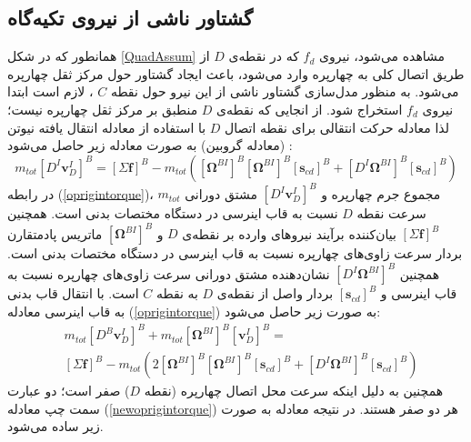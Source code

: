 \subsection{گشتاور ناشی از نیروی تكیه‌گاه}
همانطور که در شكل \ref{QuadAssum} مشاهده می‌شود، نیروی
$f_d$
که در نقطه‌ی 
$D$
از طریق اتصال کلی به چهارپره وارد می‌شود، باعث ایجاد گشتاور حول مرکز ثقل چهارپره می‌شود. به منظور مدل‌سازی گشتاور ناشی از این نیرو حول نقطه
$C$
، لازم است ابتدا نیروی
$f_d$
استخراج شود. از انجایی که نقطه‌ی
$D$
منطبق بر مرکز ثقل چهارپره نیست؛ لذا معادله حرکت انتقالی برای نقطه اتصال
$D$
با استفاده از معادله انتقال یافته نیوتن (معادله گروبین) به صورت معادله زیر حاصل می‌شود
\cite{zipfel2000modeling}
:
\begin{equation}\label{oprigintorque}
	m_{tot} \left[D^I\boldsymbol v_D^I\right]^B = 
	\left[\Sigma \boldsymbol f\right]^B-m_{tot}\left(
	\left[\boldsymbol \Omega^{BI}\right]^B
	\left[\boldsymbol\Omega^{BI}\right]^B
	\left[\boldsymbol s_{cd}\right]^B+
	\left[D^I\boldsymbol\Omega^{BI}\right]^B
	\left[\boldsymbol s_{cd}\right]^B
	\right)
\end{equation}
در رابطه
(\ref{oprigintorque})، 
$m_{tot}$
مجموع جرم چهارپره و 
$\left[D^I\boldsymbol v_D^I\right]^B$
مشتق دورانی سرعت نقطه
$D$
نسبت به قاب اینرسی در دستگاه مختصات بدنی است. همچنین
$\left[\Sigma \boldsymbol f\right]^B$
بیان‌کننده برآیند نیروهای وارده بر نقطه‌ی
$D$
و
$\left[\boldsymbol\Omega^{BI}\right]^B$
ماتریس پادمتقارن بردار سرعت زاوی‌های چهارپره نسبت به قاب اینرسی در دستگاه مختصات بدنی است. همچنین
$\left[D^I\boldsymbol \Omega^{BI}\right]^B$
نشان‌دهنده مشتق دورانی سرعت زاوی‌های چهارپره نسبت به قاب اینرسی و 
$\left[\boldsymbol s_{cd}\right]^B$
بردار واصل از نقطه‌ی
$D$
به نقطه
$C$
است. با انتقال قاب بدنی به قاب اینرسی معادله 
(\ref{oprigintorque})
به صورت زیر حاصل می‌شود:
\begin{equation}
\begin{split}\label{newoprigintorque}
	&m_{tot} \left[D^B\boldsymbol v_D^I\right]^B +
	m_{tot}\left[\boldsymbol\Omega^{BI}\right]^B
	\left[\boldsymbol v_D^{I}\right]^B = \\
	&\left[\Sigma \boldsymbol f\right]^B-m_{tot}\left(2
	\left[\boldsymbol\Omega^{BI}\right]^B
	\left[\boldsymbol\Omega^{BI}\right]^B
	\left[\boldsymbol s_{cd}\right]^B+
	\left[D^I\boldsymbol\Omega^{BI}\right]^B
	\left[\boldsymbol s_{cd}\right]^B
	\right)
\end{split}
\end{equation}
همچنین به دلیل اینكه سرعت محل اتصال چهارپره (نقطه
$D$)
صفر است؛ دو عبارت سمت چپ معادله
(\ref{newoprigintorque}) 
هر دو صفر هستند. در نتیجه معادله به صورت زیر ساده می‌شود.
